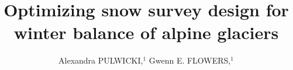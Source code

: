\documentclass[twocolumn,letterpaper]{igs}
\begin{document}
\title[Optimizing snow survey design for winter balance]{Optimizing snow survey design for winter balance of alpine glaciers}

\author[Pulwicki and Flowers]{Alexandra PULWICKI,$^1$
  Gwenn E. FLOWERS,$^1$}




\end{document}
